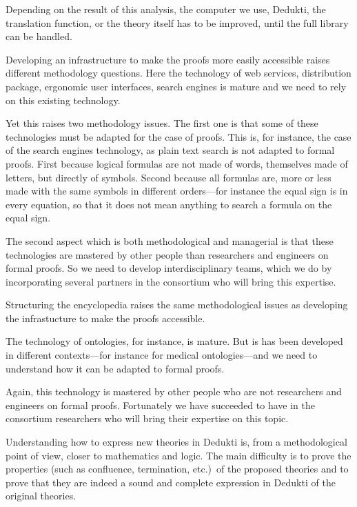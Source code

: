 Depending on the result of this analysis, the computer we use, Dedukti,
the translation function, or the theory itself has to be improved, until
the full library can be handled.


Developing an infrastructure to make the proofs more easily accessible
raises different methodology questions. Here the technology of web
services, distribution package, ergonomic user interfaces, search
engines is mature and we need to rely on this existing technology.

Yet this raises two methodology issues. The first one is that some of
these technologies must be adapted for the case of proofs. This is,
for instance, the case of the search engines technology, as plain text
search is not adapted to formal proofs. First because logical formulas
are not made of words, themselves made of letters, but directly of
symbols. Second because all formulas are, more or less made with the
same symbols in different orders---for instance the equal sign is in
every equation, so that it does not mean anything to search a formula
on the equal sign.

The second aspect which is both methodological and managerial is that
these technologies are mastered by other people than researchers and
engineers on formal proofs. So we need to develop interdisciplinary
teams, which we do by incorporating several partners in the consortium
who will bring this expertise.


Structuring the encyclopedia raises the same methodological issues
as developing the infrastucture to make the proofs accessible.

The technology of ontologies, for instance, is mature. But is has been
developed in different contexts---for instance for medical
ontologies---and we need to understand how it can be adapted to formal
proofs.

Again, this technology is mastered by other people who are not
researchers and engineers on formal proofs. Fortunately we have
succeeded to have in the consortium researchers who will bring their
expertise on this topic.


Understanding how to express new theories in Dedukti is, from a
methodological point of view, closer to mathematics and logic.  The
main difficulty is to prove the properties (such as confluence,
termination, etc.)~of the proposed theories and to prove that they are
indeed a sound and complete expression in Dedukti of the original
theories.


